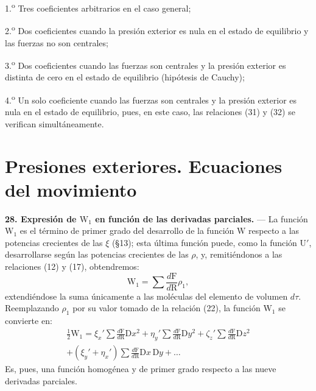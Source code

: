 1.\textsuperscript{o} Tres coeficientes arbitrarios en el caso general;

2.\textsuperscript{o} Dos coeficientes cuando la presión exterior es nula
en el estado de equilibrio y las fuerzas no son centrales;

3.\textsuperscript{o} Dos coeficientes cuando las fuerzas son centrales y
la presión exterior es distinta de cero en el estado de equilibrio
(hipótesis de Cauchy);

4.\textsuperscript{o} Un solo coeficiente cuando las fuerzas son centrales
y la presión exterior es nula en el estado de equilibrio, pues, en este
caso, las relaciones (31) y (32) se verifican simultáneamente.

\section{Presiones exteriores. Ecuaciones del movimiento}

\noindent\textbf{28. Expresión de $\mathrm{W}_1$ en función de las
derivadas parciales.} — La función $\mathrm{W}_1$ es el término de primer
grado del desarrollo de la función $\mathrm{W}$ respecto a las potencias
crecientes de las $\xi$ (§13); esta última función puede, como la función
$\mathrm{U}'$, desarrollarse según las potencias crecientes de las $\rho$,
y, remitiéndonos a las relaciones (12) y (17), obtendremos:
\[
\mathrm{W}_1=\sum\frac{d\mathrm{F}}{d\mathrm{R}}\rho_1,
\]
extendiéndose la suma únicamente a las moléculas del elemento de volumen
$d\tau$. Reemplazando $\rho_1$ por su valor tomado de la relación (22), la
función $\mathrm{W}_1$ se convierte en:
\begin{multline*}
\frac12\mathrm{W}_1=\xi_x'\sum\frac{d\mathrm{F}}{d\mathrm{R}}\mathrm{D}x^2
+\eta_y'\sum\frac{d\mathrm{F}}{d\mathrm{R}}\mathrm{D}y^2
+\zeta_z'\sum\frac{d\mathrm{F}}{d\mathrm{R}}\mathrm{D}z^2\\
+(\xi_y'+\eta_x')\sum\frac{d\mathrm{F}}{d\mathrm{R}}\mathrm{D}x\,\mathrm{D}y+\ldots
\end{multline*}
Es, pues, una función homogénea y de primer grado respecto a las nueve
derivadas parciales.


